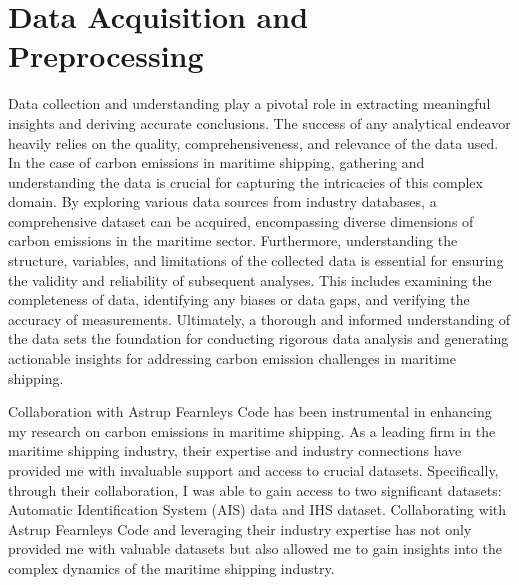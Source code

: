 \chapter{Data Acquisition and Preprocessing}

Data collection and understanding play a pivotal role in extracting meaningful insights and deriving accurate conclusions.
The success of any analytical endeavor heavily relies on the quality, comprehensiveness, and relevance of the data used.
In the case of carbon emissions in maritime shipping, gathering and understanding the data is crucial for capturing the intricacies of this complex domain.
By exploring various data sources from industry databases, a comprehensive dataset can be acquired, encompassing diverse dimensions of carbon emissions in the maritime sector.
Furthermore, understanding the structure, variables, and limitations of the collected data is essential for ensuring the validity and reliability of subsequent analyses.
This includes examining the completeness of data, identifying any biases or data gaps, and verifying the accuracy of measurements.
Ultimately, a thorough and informed understanding of the data sets the foundation for conducting rigorous data analysis and generating actionable insights for addressing carbon emission challenges in maritime shipping.

Collaboration with Astrup Fearnleys Code has been instrumental in enhancing my research on carbon emissions in maritime shipping.
As a leading firm in the maritime shipping industry, their expertise and industry connections have provided me with invaluable support and access to crucial datasets.
Specifically, through their collaboration, I was able to gain access to two significant datasets: Automatic Identification System (AIS) data and IHS dataset.
Collaborating with Astrup Fearnleys Code and leveraging their industry expertise has not only provided me with valuable datasets but also allowed me to gain insights into the complex dynamics of the maritime shipping industry.

\newpage



\newpage





